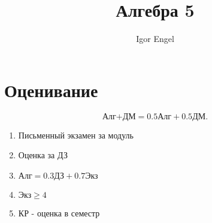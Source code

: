 \documentclass[11pt, oneside]{article}   	%
\title{Алгебра 5}
\author{Igor Engel}
\date{}
\begin{document}
\maketitle
\section{Оценивание}
    \[ \text{Алг+ДМ} = 0.5\text{Алг} + 0.5\text{ДМ} .\]
    \begin{enumerate}
        \item Письменный экзамен за модуль
        \item Оценка за ДЗ
        \item $\text{Алг} = 0.3\text{ДЗ} + 0.7\text{Экз}$ 
        \item $\text{Экз}\ge 4$
        \item КР - оценка в семестр
    \end{enumerate}
\end{document}
